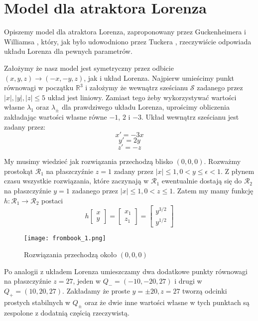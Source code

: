 \documentclass[12pt]{report}
\newcommand{\R}{\mathbb{R}}
\begin{document}
	\section{Model dla atraktora Lorenza}
	\par Opiszemy model dla atraktora Lorenza, zaproponowany przez Guckenheimera i Williamsa \cite{GW}, który, jak było udowodniono przez Tuckera \cite{Tucker}, rzeczywiście odpowiada układu Lorenza dla pewnych parametrów.
	
	\par Założymy że nasz model jest symetryczny przez odbicie $(x, y, z) \to (-x, -y, z)$, jak i układ Lorenza. Najpierw umieścimy punkt równowagi w początku $\R^3$ i założymy że wewnątrz sześcianu $\mathcal{S}$ zadanego przez $\lvert x \rvert, \lvert y \rvert, \lvert z \rvert \le 5$ układ jest liniowy. Zamiast tego żeby wykorzystywać wartości własne $\lambda_1$ oraz $\lambda_{\pm}$ dla prawdziwego układu Lorenza, uprościmy obliczenia zakładając wartości własne równe $-1$, $2$ i $-3$. Układ wewnątrz sześcianu jest zadany przez:
		\[ x' = -3x \]
		\[ y' = 2y \]
		\[ z' = -z \]
	\par My musimy wiedzieć jak rozwiązania przechodzą blisko $(0, 0, 0)$. Rozważmy prostokąt $\mathcal{R}_1$ na płaszczyźnie  $z = 1$ zadany przez $\lvert x \rvert \le 1, 0 < y \le \epsilon < 1$. Z płynem czasu wszystkie rozwiązania, które zaczynają w $\mathcal{R}_1$ ewentualnie dostają się do $\mathcal{R}_2$ na płaszczyźnie  $y = 1$ zadanego przez $\lvert x \rvert \le 1, 0 < z \le 1$. Zatem my mamy funkcję $h: \mathcal{R}_1 \to \mathcal{R}_2$ postaci
		\[ h \begin{bmatrix} x \\ y \end{bmatrix} = \begin{bmatrix} x_1 \\ z_1 \end{bmatrix} = \begin{bmatrix} y^{3/2} \\ y^{1/2} \end{bmatrix} \]
	\begin{figure}[H]
		\centering
		\texttt{[image: frombook\_1.png]}
		\caption{Rozwiązania przechodzą około $(0, 0, 0)$}
		\label{fig:frombook_1}
	\end{figure}
	\par Po analogii z układem Lorenza umieszczamy dwa dodatkowe punkty równowagi na płaszczyźnie $z = 27$, jeden w $Q_- = (-10, -20, 27)$ i drugi w $Q_+ = (10, 20, 27)$. Zakładamy że proste $y = \pm 20, z = 27$ tworzą odcinki prostych stabilnych w $Q_{\pm}$ oraz że dwie inne wartości własne w tych punktach są zespolone z dodatnią częścią rzeczywistą.
\end{document}

